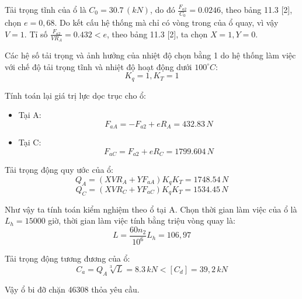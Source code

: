 \noindent Tải trọng tĩnh của ổ là $C_0 = 30.7 \, (kN)$, do đó $\frac{F_{a2}}{C_0} = 0.0246$, theo bảng 11.3 [2], chọn $e = 0,68$. Do kết cấu hệ thống mà chỉ có vòng trong của ổ quay, vì vậy $V = 1$. Tỉ số $\frac{F_{a2}}{VR_A} = 0.432 < e$, theo bảng 11.3 [2], ta chọn $X = 1, Y = 0$.

\noindent Các hệ số tải trọng và ảnh hưởng của nhiệt độ chọn bằng 1 do hệ thống làm việc với chế độ tải trọng tĩnh và nhiệt độ hoạt động dưới $100^\circ C$:
$$ K_q = 1, K_T = 1 $$

\noindent Tính toán lại giá trị lực dọc trục cho ổ:
\begin{itemize}
    \item Tại A:
    $$ F_{aA} = -F_{a2} + eR_A = 432.83 \, N $$
    \item Tại C:
    $$ F_{aC} = F_{a2} + eR_C = 1799.604 \, N $$
\end{itemize}

\noindent Tải trọng động quy ước của ổ:
$$ Q_A = (XVR_A + YF_{aA})K_qK_T = 1748.54 \, N $$
$$ Q_C = (XVR_C + YF_{aC})K_qK_T = 1534.45 \, N $$

\noindent Như vậy ta tính toán kiểm nghiệm theo ổ tại A. Chọn thời gian làm việc của ổ là $L_h = 15000$ giờ, thời gian làm việc tính bằng triệu vòng quay là:
$$ L = \frac{60n_2}{10^6} L_h = 106,97 $$

\noindent Tải trọng động tương đương của ổ:
$$ C_a = Q_A \sqrt[3]{L} = 8.3 \, kN < [C_d] = 39,2 \, kN $$

\noindent Vậy ổ bi đỡ chặn 46308 thỏa yêu cầu.

